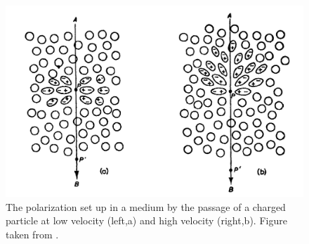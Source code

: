 \begin{figure}[ht] 
        \centering \includegraphics[width=0.7\columnwidth]{figures/dipole.png}

        \caption{
                \label{fig:jelley} %
                The polarization set up in a medium by the passage of a charged particle at low velocity (left,a) and high velocity (right,b). Figure taken from \cite{jelley}.
        }
\end{figure}
